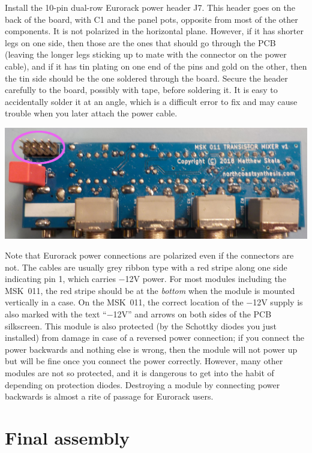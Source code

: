 Install the 10-pin dual-row Eurorack power header J7.  This header goes on
the back of the board, with C1 and the panel pots, opposite from most of the
other components.  It is not polarized
in the horizontal plane.  However, if it has shorter legs on one side, then
those are the ones that should go through the PCB (leaving the longer legs
sticking up to mate with the connector on the power cable), and if it has
tin plating on one end of the pins and gold on the other, then the tin side
should be the one soldered through the board.  Secure the header carefully
to the board, possibly with tape, before soldering it.  It is easy to
accidentally solder it at an angle, which is a difficult error to fix and
may cause trouble when you later attach the power cable.

\noindent\includegraphics[width=\linewidth]{power.jpg}

Note that Eurorack power connections are polarized even if the connectors
are not.  The cables are usually grey ribbon type with a red stripe along
one side indicating pin 1, which carries $-$12V power.  For most modules
including the MSK~011, the red stripe should be at the \emph{bottom} when
the module is mounted vertically in a case.  On the MSK~011, the correct
location of the $-$12V supply is also marked with the text ``$-$12V'' and
arrows on both sides of the PCB silkscreen.  This module is also protected
(by the Schottky diodes you just installed) from damage in case of a
reversed power connection; if you connect the power backwards and nothing
else is wrong, then the module will not power up but will be fine once you
connect the power correctly.  However, many other modules are not so
protected, and it is dangerous to get into the habit of depending on
protection diodes.  Destroying a module by connecting power backwards is
almost a rite of passage for Eurorack users.

\section{Final assembly}

